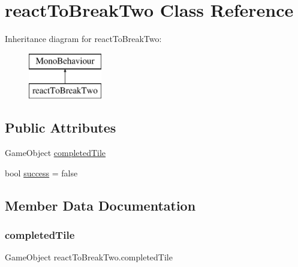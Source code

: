 \hypertarget{classreact_to_break_two}{}\section{react\+To\+Break\+Two Class Reference}
\label{classreact_to_break_two}
Inheritance diagram for react\+To\+Break\+Two\+:\begin{figure}[H]
\begin{center}
\leavevmode
\includegraphics[height=2.000000cm]{classreact_to_break_two}
\end{center}
\end{figure}
\subsection*{Public Attributes}
\begin{DoxyCompactItemize}
\item 
Game\+Object \hyperlink{classreact_to_break_two_a6f8fdc16574f3c73684dd2dc88dcf0c9}{completed\+Tile}
\item 
bool \hyperlink{classreact_to_break_two_aabe9486914d079d21b6bc02a382d9263}{success} = false
\end{DoxyCompactItemize}


\subsection{Member Data Documentation}
\mbox{\label{classreact_to_break_two_a6f8fdc16574f3c73684dd2dc88dcf0c9}} 
\subsubsection{\texorpdfstring{completed\+Tile}{completedTile}}
{\footnotesize\ttfamily Game\+Object react\+To\+Break\+Two.\+completed\+Tile}

\mbox{\label{classreact_to_break_two_aabe9486914d079d21b6bc02a382d9263}} 
